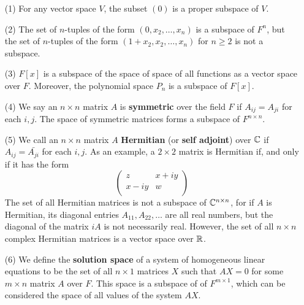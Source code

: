 \begin{example}
    \begin{enumerate}
        \item[(1)] For any vector space $V$, the subset  $(0)$ is a proper subspace 
            of $V$.

        \item[(2)] The set of $n$-tuples of the form  $(0,x_2, \dots, x_n)$ is a 
            subspace of $F^n$, but the set of  $n$-tuples of the form  
            $(1+x_2,x_2, \dots, x_n)$ for $n \geq 2$ is not a subspace.

        \item[(3)] $F[x]$ is a subspace of the space of space of all functions as a 
            vector space over $F$. Moreover, the polynomial space $P_n$ is a subspace 
            of  $F[x]$.

        \item[(4)] We say an $n \times n$ matrix $A$ is \textbf{symmetric} over the 
            field $F$ if  $A_{ij}=A_{ji}$ for each $i,j$. The space of symmetric 
            matrices forms a subspace of  $F^{n \times n}$.

        \item[(5)] We call an $n \times n$ matrix $A$ \textbf{Hermitian} (or 
            \textbf{self adjoint}) over $\mathbb{C}$ if  $A_{ij}=\bar{A_{ji}}$ for each $i,j$. 
            As an example, a  $2 \times 2$ matrix is Hermitian if, and only if it has 
            the form
                \begin{equation*}
                    \begin{pmatrix}
                        z    & x+iy \\
                        x-iy & w \\
                    \end{pmatrix}
                \end{equation*}
            The set of all Hermitian matrices is not a subspace of $\mathbb{C}^{n \times n}$, 
            for if $A$ is Hermitian, its diagonal entries  $A_{11}, A_{22}, \dots$ are 
            all real numbers, but the diagonal of the matrix $iA$ is not necessarily 
            real. However, the set of all  $n \times n$ complex Hermitian matrices is a 
            vector space over $\mathbb{R}$.

        \item[(6)] We define the \textbf{solution space} of a system of homogeneous 
            linear equations to be the set of all $n \times 1$ matrices  $X$ such that 
             $AX=0$ for some  $m \times n$ matrix  $A$ over  $F$. This space is a 
             subspace of of  $F^{m \times 1}$, which can be considered the space of all
             values of the system $AX$.
    \end{enumerate}
\end{example} 

